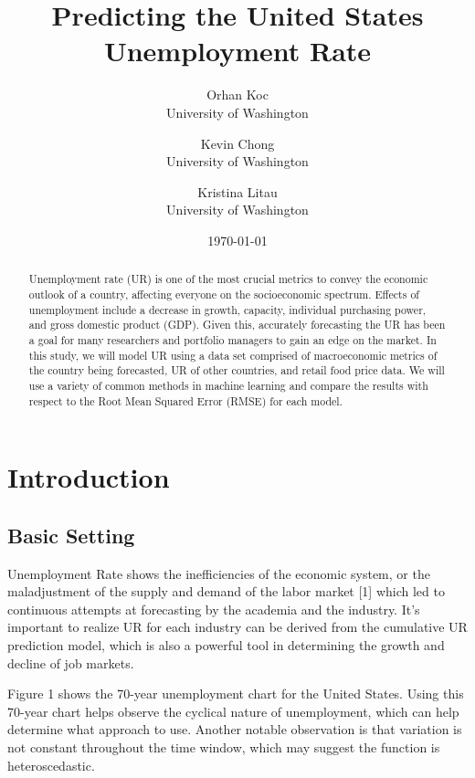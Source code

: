 \documentclass{article}
\title{Predicting the United States Unemployment Rate}
\author{Orhan Koc \\
	University of Washington  \\
	\and 
	Kevin Chong  \\
	University of Washington  \\
	\and 
	Kristina Litau\\
	University of Washington  \\
	}
\date{\today}
\begin{document}
\maketitle


\begin{abstract}
	Unemployment rate (UR) is one of the most crucial metrics to convey the economic outlook of a country, affecting everyone on the socioeconomic spectrum. Effects of unemployment include a decrease in growth, capacity, individual purchasing power, and gross domestic product (GDP). Given this, accurately forecasting the UR has been a goal for many researchers and portfolio managers to gain an edge on the market. In this study, we will model UR using a data set comprised of macroeconomic metrics of the country being forecasted, UR of other countries, and retail food price data. We will use a variety of common methods in machine learning and compare the results with respect to the Root Mean Squared Error (RMSE) for each model. 
\end{abstract}

\newpage
\tableofcontents
\newpage

\section{Introduction}

	\subsection{Basic Setting}
	Unemployment Rate shows the inefficiencies of the economic system, or the maladjustment of the supply and demand of the labor market [1] which led to continuous attempts at forecasting by the academia and the industry. It’s important to realize UR for each industry can be derived from the cumulative UR prediction model, which is also a powerful tool in determining the growth and decline of job markets.

	Figure 1 shows the 70-year unemployment chart for the United States. Using this 70-year chart helps observe the cyclical nature of unemployment, which can help determine what approach to use. Another notable observation is that variation is not constant throughout the time window, which may suggest the function is heteroscedastic.
\end{document}
